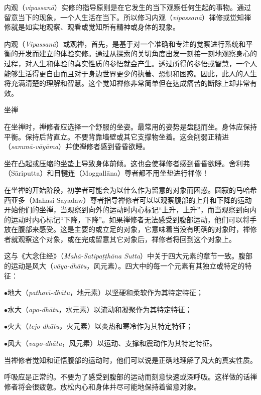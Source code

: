 内观（{\it vipassan\=a}）实修的指导原则是在它发生的当下观察任何生起的事物。通过留意当下的现象，一个人生活在当下。所以修习内观（{\it vipassan\=a}）禅修或觉知禅修就是如实地观察、观看或觉知所有精神或身体的现象。

内观（{\it Vipassan\=a}）或观禅，首先，是\1基于对一个准确和专注的觉察进行系统和平衡的开发而建立的体验实修。通过从探索的关切角度出发一刻接一刻地观察身心的过程，对人生和体验的真实性质的参悟就会产生。透过所得的参悟或智慧，一个人能够生活得更自由而且对于身边世界更少的执著、恐惧和困惑。因此，此人的人生将充满清楚的理解和智慧。这个觉知禅修非常简单但在达成痛苦的断除上却非常有效。

\sssubsectnonib 坐禅

在坐禅时，禅修者应选择一个舒服的坐姿。最常用的姿势是盘腿而坐。身体应保持平衡。保持后背直立。不要背靠墙壁或其它支撑物坐着。这会削弱正精进（{\it samm\=a-v\=ay\=ama}）并使禅修者感到昏昏欲睡。

坐在凸起或压缩的坐垫上导致身体前倾。这也会使禅修者感到昏昏欲睡。舍利弗（S\=ariputta）和目犍连（Moggall\=ana）尊者都不用坐垫进行禅修！

在坐禅的开始阶段，初学者可能会为以什么作为留意的对象而困惑。圆寂的马哈希西亚多（Mahasi Sayadaw）尊者指导禅修者可以以观察腹部的上升和下降的运动开始他们的坐禅，当观察到向外的运动时内心标记“上升，上升”，而当观察到向内的运动时内心标记“下降，下降”。如果禅修者无法感受到腹部运动，他们可以将手放在腹部来感受。这是主要的或立足的对象，它意味着当没有明确的对象时，禅修者就观察\1这个对象，或在完成留意其它对象后，禅修者将回到这个对象上。

这与《大念住经》（{\it Mah\=a-Satipa\d t\d th\=ana Sutta}）中关于四大元素的章节一致。腹部的运动是风大（{\it v\=aya-dh\=atu}，风元素）。四大中的每一个元素有其独立或特定的特征：

{
\leftskip=1.6pc
\item{$\bullet$}地大（{\it pathav\=\i-dh\=atu}，地元素）以坚硬和柔软作为其特定特征；
\item{$\bullet$}水大（{\it apo-dh\=atu}，水元素）以流动和凝聚作为其特定特征；
\item{$\bullet$}火大（{\it tejo-dh\=atu}，火元素）以炎热和寒冷作为其特定特征；
\item{$\bullet$}风大（{\it vayo-dh\=atu}，风元素）以运动、支撑和震动作为其特定特征。

}

当禅修者觉知和证悟腹部的运动时，他们可以说是正确地理解了风大的真实性质。

呼吸应是正常的。不要为了感受到腹部的运动而刻意快速或深呼吸。这样做的话禅修者将会很疲惫。放松内心和身体并尽可能地保持着留意对象。

